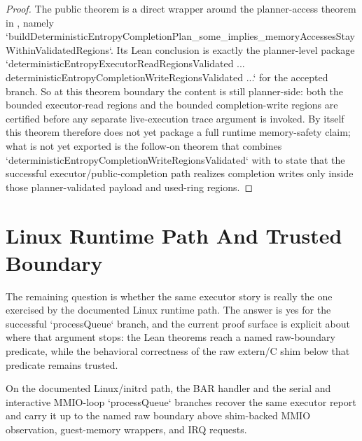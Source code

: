 \begin{proof}
\leanok
{}
The public theorem is a direct wrapper around the planner-access theorem in , namely `buildDeterministicEntropyCompletionPlan_some_implies_memoryAccessesStayWithinValidatedRegions`.
Its Lean conclusion is exactly the planner-level package `deterministicEntropyExecutorReadRegionsValidated ... \land deterministicEntropyCompletionWriteRegionsValidated ...` for the accepted branch.
So at this theorem boundary the content is still planner-side: both the bounded executor-read regions and the bounded completion-write regions are certified before any separate live-execution trace argument is invoked.
By itself this theorem therefore does not yet package a full runtime memory-safety claim; what is not yet exported is the follow-on theorem that combines `deterministicEntropyCompletionWriteRegionsValidated` with  to state that the successful executor/public-completion path realizes completion writes only inside those planner-validated payload and used-ring regions.
\end{proof}

\section{Linux Runtime Path And Trusted Boundary}

The remaining question is whether the same executor story is really the one exercised by the documented Linux runtime path.
The answer is yes for the successful `processQueue` branch, and the current proof surface is explicit about where that argument stops: the Lean theorems reach a named raw-boundary predicate, while the behavioral correctness of the raw extern/C shim below that predicate remains trusted.

\begin{theorem}
\label{thm:shim-boundary}
\leanok
On the documented Linux/initrd path, the BAR handler and the serial and interactive MMIO-loop `processQueue` branches recover the same executor report and carry it up to the named raw boundary above shim-backed MMIO observation, guest-memory wrappers, and IRQ requests.
\end{theorem}

